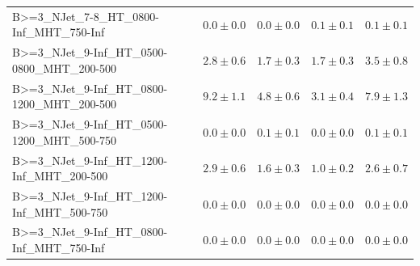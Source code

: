 \documentclass{beamer}
\begin{document}
\begin{frame}
\begin{tabular}{lrrrr}
      B>=3\_NJet\_7-8\_HT\_0800-Inf\_MHT\_750-Inf &               $0.0\pm0.0$&              $0.0\pm0.0$&              $0.1\pm0.1$&                   $0.1\pm0.1$ \\ 
   B>=3\_NJet\_9-Inf\_HT\_0500-0800\_MHT\_200-500 &               $2.8\pm0.6$&              $1.7\pm0.3$&              $1.7\pm0.3$&                   $3.5\pm0.8$ \\ 
   B>=3\_NJet\_9-Inf\_HT\_0800-1200\_MHT\_200-500 &               $9.2\pm1.1$&              $4.8\pm0.6$&              $3.1\pm0.4$&                   $7.9\pm1.3$ \\ 
   B>=3\_NJet\_9-Inf\_HT\_0500-1200\_MHT\_500-750 &               $0.0\pm0.0$&              $0.1\pm0.1$&              $0.0\pm0.0$&                   $0.1\pm0.1$ \\ 
    B>=3\_NJet\_9-Inf\_HT\_1200-Inf\_MHT\_200-500 &               $2.9\pm0.6$&              $1.6\pm0.3$&              $1.0\pm0.2$&                   $2.6\pm0.7$ \\ 
    B>=3\_NJet\_9-Inf\_HT\_1200-Inf\_MHT\_500-750 &               $0.0\pm0.0$&              $0.0\pm0.0$&              $0.0\pm0.0$&                   $0.0\pm0.0$ \\ 
    B>=3\_NJet\_9-Inf\_HT\_0800-Inf\_MHT\_750-Inf &               $0.0\pm0.0$&              $0.0\pm0.0$&              $0.0\pm0.0$&                   $0.0\pm0.0$ \\ 
\bottomrule 
\end{tabular}
\end{frame}
\end{document}

